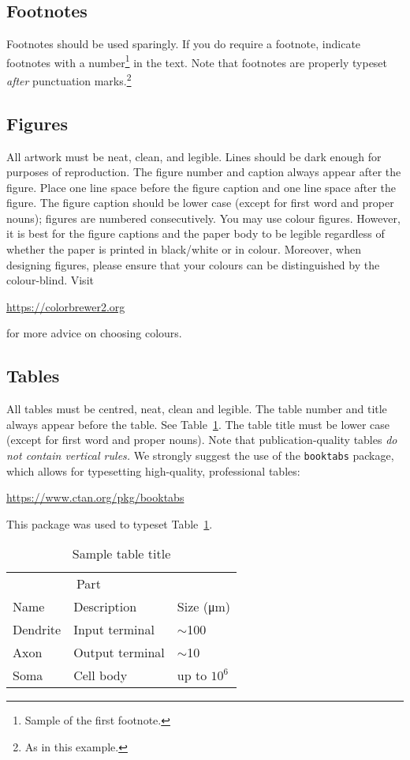 \documentclass{article}
\begin{document}
\subsection{Footnotes}

Footnotes should be used sparingly.  If you do require a footnote, indicate
footnotes with a number\footnote{Sample of the first footnote.} in the
text.
%
Note that footnotes are properly typeset \emph{after} punctuation
marks.\footnote{As in this example.}

\subsection{Figures}

All artwork must be neat, clean, and legible. Lines should be dark enough for
purposes of reproduction. The figure number and caption always appear after the
figure. Place one line space before the figure caption and one line space after
the figure. The figure caption should be lower case (except for first word and
proper nouns); figures are numbered consecutively.
%
You may use colour figures.  However, it is best for the figure captions
and the paper body to be legible regardless of whether the paper is
printed in black/white or in colour.
%
Moreover, when designing figures, please ensure that your colours can be
distinguished by the colour-blind. Visit
%
\begin{center}
  \url{https://colorbrewer2.org}
\end{center}
%
for more advice on choosing colours.

\subsection{Tables}

All tables must be centred, neat, clean and legible.  The table number and
title always appear before the table.  See Table~\ref{sample-table}.
The table title must be lower case (except for first word and proper
nouns).
%
Note that publication-quality tables \emph{do not contain vertical rules.} We
strongly suggest the use of the \verb+booktabs+ package, which allows for
typesetting high-quality, professional tables:
\begin{center}
  \url{https://www.ctan.org/pkg/booktabs}
\end{center}
This package was used to typeset Table~\ref{sample-table}.

\begin{table}
  \caption{%
  Sample table title
  }
  \label{sample-table}
  \centering
  \begin{tabular}{lll}
    \toprule
    \multicolumn{2}{c}{Part}                   \\
    \cmidrule(r){1-2}
    Name     & Description     & Size (\si{\micro\meter}) \\
    \midrule
    Dendrite & Input terminal  & $\sim$100     \\
    Axon     & Output terminal & $\sim$10      \\
    Soma     & Cell body       & up to $10^6$  \\
    \bottomrule
  \end{tabular}
\end{table}
\end{document}

